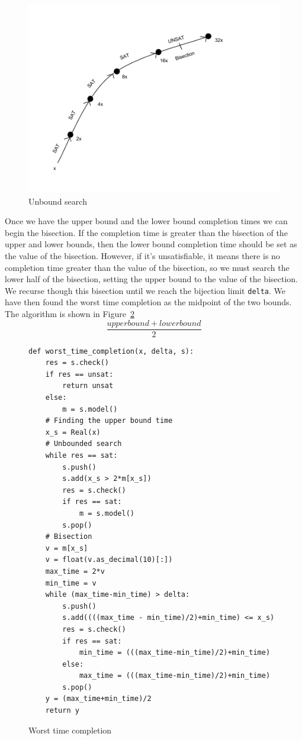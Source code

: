 \documentclass[a4paper]{report}
\begin{document}
\begin{figure}[h]
\center
\includegraphics[scale=0.30]{UnboundSearch.png}
\caption{Unbound search}
\label{fig:Unbound search}
\end{figure}

Once we have the upper bound and the lower bound completion times we can begin the bisection. If the completion time is greater than the bisection of the upper and lower bounds, then the lower bound completion time should be set as the value of the bisection. However, if it's unsatisfiable, it means there is no completion time greater than the value of the bisection, so we must search the lower half of the bisection, setting the upper bound to the value of the bisection. We recurse though this bisection until we reach the bijection limit \texttt{delta}. We have then found the worst time completion as the midpoint of the two bounds. The algorithm is shown in Figure~\ref{fig:Worst Time Completion} \\
\[
\frac{upperbound + lowerbound}{2}
\]

\begin{figure}[H]
\lstset{numbers=left, showspaces=false,
    showstringspaces=false, tabsize=2, breaklines=true,
    xleftmargin=5.0ex,
}
\begin{lstlisting}[frame=single]
def worst_time_completion(x, delta, s):
	res = s.check()
	if res == unsat:
		return unsat
	else:
		m = s.model()
	# Finding the upper bound time
	x_s = Real(x)
	# Unbounded search
	while res == sat:
		s.push()
		s.add(x_s > 2*m[x_s])
		res = s.check()
		if res == sat:
			m = s.model()
		s.pop()
	# Bisection
	v = m[x_s]
	v = float(v.as_decimal(10)[:])
	max_time = 2*v
	min_time = v
	while (max_time-min_time) > delta:
		s.push()
		s.add((((max_time - min_time)/2)+min_time) <= x_s)
		res = s.check()
		if res == sat:
			min_time = (((max_time-min_time)/2)+min_time)
		else:
			max_time = (((max_time-min_time)/2)+min_time)
		s.pop()
	y = (max_time+min_time)/2
	return y 
\end{lstlisting}
\caption{Worst time completion}
\label{fig:Worst Time Completion}
\end{figure}
\end{document}
